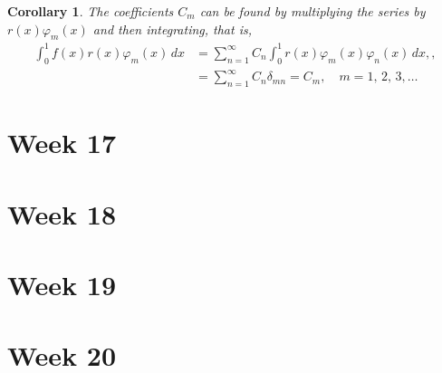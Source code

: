 \documentclass{article}
\newtheorem{corollary}{Corollary}
\begin{document}
\begin{corollary}
    The coefficients $C_m$ can be found by multiplying the series by $r(x)\varphi_m(x)$ and then integrating, that is,
    \begin{align}
        \int_0^1 f(x)r(x)\varphi_m(x)\,dx &= \sum_{n=1}^\infty C_n\int_0^1 r(x)\varphi_m(x)\varphi_n(x)\,dx,\nonumber,\\
        &= \sum_{n=1}^\infty C_n\delta_{mn} = C_m,\quad m=1,\,2,\,3,\ldots
    \end{align}
\end{corollary}



\section{Week 17}

\section{Week 18}

\section{Week 19}

\section{Week 20}
\end{document}
